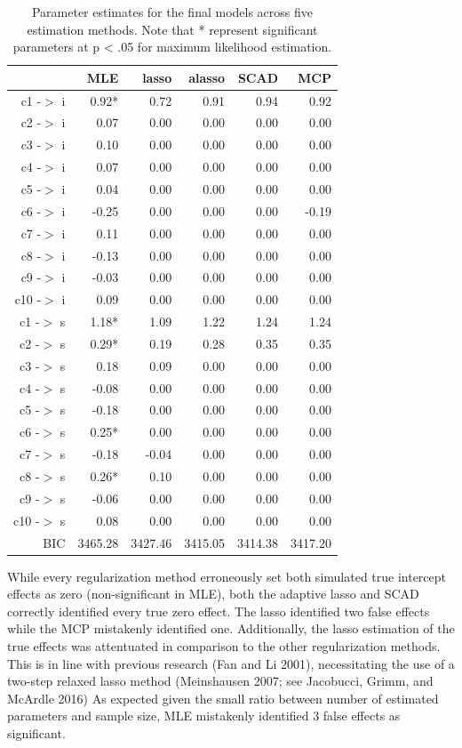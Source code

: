 \documentclass[article]{jss}
\begin{document}
\begin{table}[ht]
\centering
\begin{tabular}{rrrrrr}
  \hline
 & MLE & lasso & alasso & SCAD & MCP \\ 
  \hline
c1 -$>$ i & 0.92* & 0.72 & 0.91 & 0.94 & 0.92 \\ 
  c2 -$>$ i & 0.07 & 0.00 & 0.00 & 0.00 & 0.00 \\ 
  c3 -$>$ i & 0.10 & 0.00 & 0.00 & 0.00 & 0.00 \\ 
  c4 -$>$ i & 0.07 & 0.00 & 0.00 & 0.00 & 0.00 \\ 
  c5 -$>$ i & 0.04 & 0.00 & 0.00 & 0.00 & 0.00 \\ 
  c6 -$>$ i & -0.25 & 0.00 & 0.00 & 0.00 & -0.19 \\ 
  c7 -$>$ i & 0.11 & 0.00 & 0.00 & 0.00 & 0.00 \\ 
  c8 -$>$ i & -0.13 & 0.00 & 0.00 & 0.00 & 0.00 \\ 
  c9 -$>$ i & -0.03 & 0.00 & 0.00 & 0.00 & 0.00 \\ 
  c10 -$>$ i & 0.09 & 0.00 & 0.00 & 0.00 & 0.00 \\ 
  c1 -$>$ s & 1.18* & 1.09 & 1.22 & 1.24 & 1.24 \\ 
  c2 -$>$ s & 0.29* & 0.19 & 0.28 & 0.35 & 0.35 \\ 
  c3 -$>$ s & 0.18 & 0.09 & 0.00 & 0.00 & 0.00 \\ 
  c4 -$>$ s & -0.08 & 0.00 & 0.00 & 0.00 & 0.00 \\ 
  c5 -$>$ s & -0.18 & 0.00 & 0.00 & 0.00 & 0.00 \\ 
  c6 -$>$ s & 0.25* & 0.00 & 0.00 & 0.00 & 0.00 \\ 
  c7 -$>$ s & -0.18 & -0.04 & 0.00 & 0.00 & 0.00 \\ 
  c8 -$>$ s & 0.26* & 0.10 & 0.00 & 0.00 & 0.00 \\ 
  c9 -$>$ s & -0.06 & 0.00 & 0.00 & 0.00 & 0.00 \\ 
  c10 -$>$ s & 0.08 & 0.00 & 0.00 & 0.00 & 0.00 \\ 
  BIC & 3465.28 & 3427.46 & 3415.05 & 3414.38 & 3417.20 \\ 
   \hline
\end{tabular}
\caption{Parameter estimates for the final models across five estimation methods. Note that * represent significant parameters at p < .05 for maximum likelihood estimation.}
\end{table}

While every regularization method erroneously set both simulated true
intercept effects as zero (non-significant in MLE), both the adaptive
lasso and SCAD correctly identified every true zero effect. The lasso
identified two false effects while the MCP mistakenly identified one.
Additionally, the lasso estimation of the true effects was attentuated
in comparison to the other regularization methods. This is in line with
previous research (Fan and Li 2001), necessitating the use of a two-step
relaxed lasso method (Meinshausen 2007; see Jacobucci, Grimm, and
McArdle 2016) As expected given the small ratio between number of
estimated parameters and sample size, MLE mistakenly identified 3 false
effects as significant.
\end{document}
